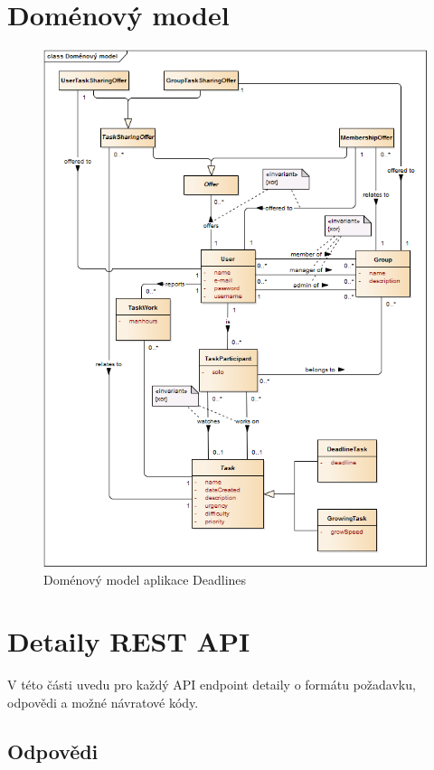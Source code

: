 \documentclass[thesis=B,czech]{FITthesis}[2012/06/26]
\begin{document}
\chapter{Doménový model}
	\begin{figure}\centering
		\includegraphics[width=1\textwidth]{ea-diagrams/domain-model.png}
		\caption[Doménový model]{Doménový model aplikace Deadlines}
		\label{diagram:domain-model}
	\end{figure}

\chapter{Detaily REST API}
	\label{appdx:restapi}
	V této části uvedu pro každý API endpoint detaily o formátu požadavku, odpovědi a možné návratové kódy.
	\section{Odpovědi}
\end{document}
